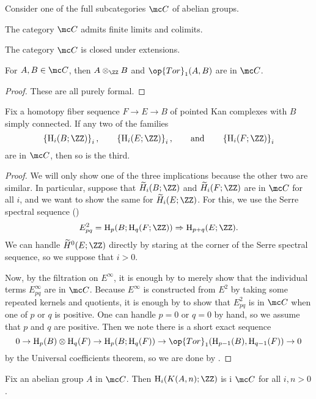 \documentclass[../notes.tex]{subfiles}
\begin{document}
\begin{lemma} \label{lem:c-is-ideal}
	Consider one of the full subcategories $\mc C$ of abelian groups.
	\begin{listalph}
		\item The category $\mc C$ admits finite limits and colimits.
		\item The category $\mc C$ is closed under extensions.
		\item For $A,B\in\mc C$, then $A\otimes_\ZZ B$ and $\op{Tor}_1(A,B)$ are in $\mc C$.
	\end{listalph}
\end{lemma}
\begin{proof}
	These are all purely formal.
\end{proof}
\begin{lemma} \label{lem:homotopy-fiber-to-c}
	Fix a homotopy fiber sequence $F\to E\to B$ of pointed Kan complexes with $B$ simply connected. If any two of the families
	\[\left\{\mathrm H_i(B;\ZZ)\right\}_i,\qquad\left\{\mathrm H_i(E;\ZZ)\right\}_i,\qquad\text{and}\qquad\left\{\mathrm H_i(F;\ZZ)\right\}_i\]
	are in $\mc C$, then so is the third.
\end{lemma}
\begin{proof}
	We will only show one of the three implications because the other two are similar. In particular, suppose that $\widetilde H_i(B;\ZZ)$ and $\widetilde H_i(F;\ZZ)$ are in $\mc C$ for all $i$, and we want to show the same for $\widetilde H_i(E;\ZZ)$. For this, we use the Serre spectral sequence ()
	\[E^2_{pq}=\mathrm H_p(B;\mathrm H_q(F;\ZZ))\Rightarrow\mathrm H_{p+q}(E;\ZZ).\]
	We can handle $\widetilde H^0(E;\ZZ)$ directly by staring at the corner of the Serre spectral sequence, so we suppose that $i>0$.

	Now, by the filtration on $E^\infty$, it is enough by  to merely show that the individual terms $E^\infty_{pq}$ are in $\mc C$. Because $E^\infty$ is constructed from $E^2$ by taking some repeated kernels and quotients, it is enough by  to show that $E^2_{pq}$ is in $\mc C$ when one of $p$ or $q$ is positive. One can handle $p=0$ or $q=0$ by hand, so we assume that $p$ and $q$ are positive. Then we note there is a short exact sequence
	\[0\to\mathrm H_p(B)\otimes\mathrm H_q(F)\to\mathrm H_p(B;\mathrm H_q(F))\to\op{Tor}_1(\mathrm H_{p-1}(B),\mathrm H_{q-1}(F))\to0\]
	by the Universal coefficients theorem, so we are done by .
\end{proof}
\begin{lemma} \label{lem:k-a-n-in-c}
	Fix an abelian group $A$ in $\mc C$. Then $\mathrm H_i(K(A,n);\ZZ)$ is i $\mc C$ for all $i,n>0$.
\end{lemma}
\end{document}
